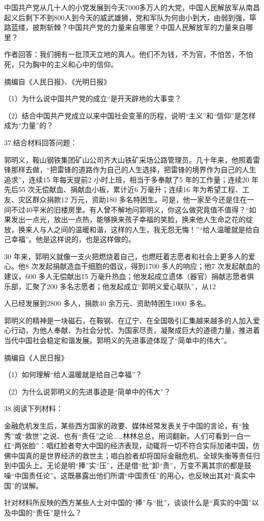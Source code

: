 \documentclass[UTF8,11pt]{ctexart}
\begin{document}
中国共产党从几十人的小党发展到今天7000多万人的大党，中国人民解放军从南昌起义后剩下不到800人到今天的威武雄狮，党和军队为何由小到大，由弱到强，筚路蓝缕，披荆斩棘？中国共产党的力量来自哪里？中国人民解放军的力量来自哪里？

作者回答：我们拥有一批顶天立地的真人。他们不为钱，不为官，不怕苦，不怕死，只为胸中的主义和心中的信仰。

摘编自《人民日报》、《光明日报》

（1）为什么说中国共产党的成立“是开天辟地的大事变？


（2）结合中国共产党成立以来中国社会变革的历程，说明“主义”和“信仰”是怎样成为“力量”的？


37.结合材料回答问题：

郭明义，鞍山钢铁集团矿山公司齐大山铁矿采场公路管理员。几十年来，他照着雷锋那样去做，“把雷锋的道路作为自己的人生选择，把雷锋的境界作为自己的人生追求”，连续15 年每天提前2 小时上班，相当于多奉献了5 年的工作量；连续20 年先后55 次无偿献血、捐献血小板，累计近6 万毫升；连续16 年为希望工程、工友、灾区群众捐款12 万元，资助180 多名特困生。可是，他一家至今还是住在一间不过40平米的旧楼房里。有人曾不解地问郭明义，你这么做究竟值不值得？“如果发出一点光，放出一点热，能够换来孩子幸福的笑脸，换来他人生命之花的绽放，换来人与人之间的温暖和谐，这样的人生，我无怨无悔！”“给人温暖就是给自己幸福”。他是这样说的，也是这样做的。

30 年来，郭明义就像一支火把燃烧着自己，也燃旺着志愿者和社会上更多人的爱心。他8 次发起捐献造血干细胞的倡议，得到1700 多人的响应；他7 次发起献血的建议，600 多人无偿献出15 万毫升热血；他发起成立遗体（器官）捐献志愿者俱乐部，汇聚了200 多名志愿者；他发起成立“郭明义爱心联队”，从12

人已经发展到2800 多人，捐款40 余万元、资助特困生1000 多名。

郭明义的精神是一块磁石，在鞍钢、在辽宁、在全国吸引汇集越来越多的人加入爱心行动，为他人奉献、为社会分忧、为国家尽责，凝聚成巨大的道德力量，推进着当代中国社会稳定和谐发展。郭明义的先进事迹体现了“简单中的伟大”。

摘编自《人民日报》

（1）如何理解“给人温暖就是给自己幸福”？


（2）为什么说郭明义的先进事迹是“简单中的伟大”？


38.阅读下列材料：

金融危机发生后，某些西方国家的政要、媒体经常发表关于中国的言论，有“独秀”或“救世”之说、也有“责任”之论……林林总总，用词翻新。人们可看到一白一红“两张脸”：唱红脸者夸大中国的经济表现，动辄将一切不符合实际加诸中国，仿佛中国真的是世界经济的救世主；唱白脸者却将国际金融危机、全球失衡等责任归到中国头上。无论是明“捧”实“压”，还是借“批”卸“责”，万变不离其宗的都是鼓噪“中国责任论”。这既暴露出他们所谓“中国责任”的用心，也反映出其对“真实中国”的误解。

针对材料所反映的西方某些人士对中国的“捧”与“批”，谈谈什么是“真实的中国”以及中国的“责任”是什么？
\end{document}
